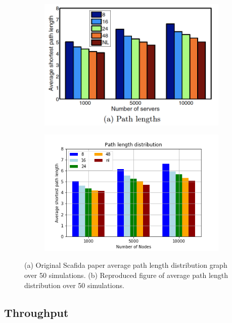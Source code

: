 \begin{figure}[h!]
\begin{subfigure}[b]{0.5\textwidth}
\centering
 \vspace{3pt}%
   \includegraphics[width=0.95\linewidth]{figures/path_lengths_original}
   \caption{}
   \label{fig:Ng1} 
\end{subfigure}

\begin{subfigure}[b]{0.5\textwidth}
\centering
   \includegraphics[width=0.95\linewidth]{figures/path_lengths}
   \caption{}
   \label{fig:Ng2}
\end{subfigure}

\caption{(a) Original Scafida paper average path length distribution graph over 50 simulations. (b) Reproduced figure of average path length distribution over 50 simulations.}
\end{figure}

\subsection{Throughput}

